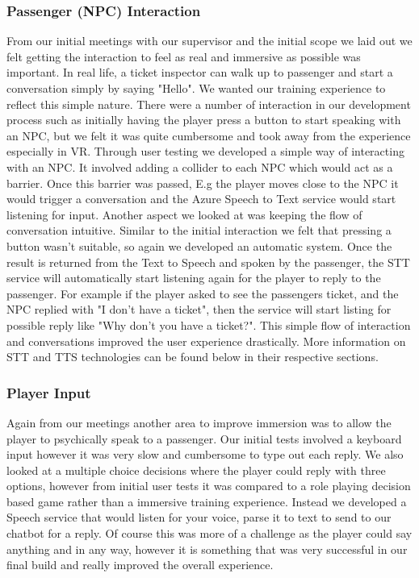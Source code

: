 \subsubsection{Passenger (NPC) Interaction}
From our initial meetings with our supervisor and the initial scope we laid out we felt getting the interaction to feel as real and immersive as possible was important. In real life, a ticket inspector can walk up to passenger and start a conversation simply by saying "Hello". We wanted our training experience to reflect this simple nature. There were a number of interaction in our development process such as initially having the player press a button to start speaking with an NPC, but we felt it was quite cumbersome and took away from the experience especially in VR. Through user testing we developed a simple way of interacting with an NPC. It involved adding a collider to each NPC which would act as a barrier. Once this barrier was passed, E.g the player moves close to the NPC it would trigger a conversation and the Azure Speech to Text service would start listening for input. Another aspect we looked at was keeping the flow of conversation intuitive. Similar to the initial interaction we felt that pressing a button wasn't suitable, so again we developed an automatic system. Once the result is returned from the Text to Speech and spoken by the passenger, the STT service will automatically start listening again for the player to reply to the passenger. For example if the player asked to see the passengers ticket, and the NPC replied with "I don't have a ticket", then the service will start listing for possible reply like "Why don't you have a ticket?". This simple flow of interaction and conversations improved the user experience drastically. More information on STT and TTS technologies can be found below in their respective sections. 

\subsubsection{Player Input}
Again from our meetings another area to improve immersion was to allow the player to psychically speak to a passenger. Our initial tests involved a keyboard input however it was very slow and cumbersome to type out each reply. We also looked at a multiple choice decisions where the player could reply with three options, however from initial user tests it was compared to a role playing decision based game rather than a immersive training experience. Instead we developed a Speech service that would listen for your voice, parse it to text to send to our chatbot for a reply. Of course this was more of a challenge as the player could say anything and in any way, however it is something that was very successful in our final build and really improved the overall experience.


